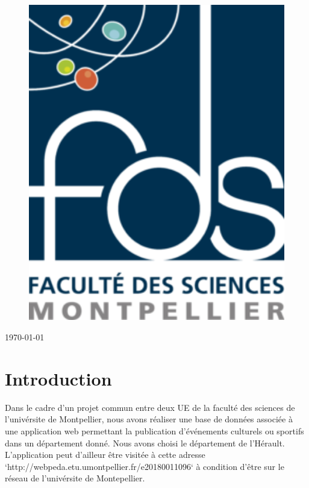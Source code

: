 \documentclass[oneside,11pt,a4paper]{article}
\begin{document}
\begin{titlepage}
\begin{figure}[h]
\begin{minipage}[c]{.30\linewidth}
			\includegraphics[width=1\textwidth]{img/fds.png}
		\end{minipage}
	\end{figure}

	\vspace{1.5cm}

\vfill
	{\large \today\par}
\end{titlepage}
\section{Introduction}

Dans le cadre d'un projet commun entre deux UE de la faculté des sciences de l'univérsite de Montpellier, nous avons réaliser une base de données associée à une application web permettant la publication d’événements culturels ou sportifs dans un département donné. Nous avons choisi le département de l'Hérault. L'application peut d'ailleur être visitée à cette adresse `http://webpeda.etu.umontpellier.fr/e20180011096` à condition d'être sur le réseau de l'univérsite de Montepellier.
\end{document}
